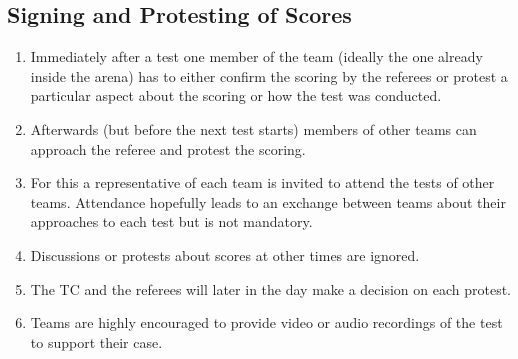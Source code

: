 \subsection{Signing and Protesting of Scores}
\label{rule:signing}
\begin{enumerate}
	\item Immediately after a test one member of the team (ideally the one already inside the arena) has to either confirm the scoring by the referees or protest a particular aspect about the scoring or how the test was conducted.
	\item Afterwards (but before the next test starts) members of other teams can approach the referee and protest the scoring.
	\item For this a representative of each team is invited to attend the tests of other teams. Attendance hopefully leads to an exchange between teams about their approaches to each test but is not mandatory.
	\item Discussions or protests about scores at other times are ignored.
	\item The TC and the referees will later in the day make a decision on each protest.
	\item Teams are highly encouraged to provide video or audio recordings of the test to support their case.
\end{enumerate}


